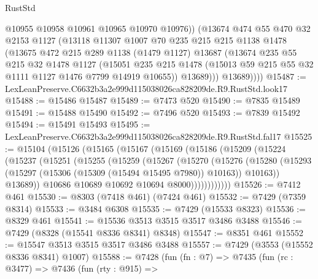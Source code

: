 \begin{lexlean}{RustStd}
\begin{coremodule}
              @10955
              @10958
              @10961
              @10965
              @10970
              @10976))
          (@13674
            @474
            @55
            @470
            @32
            @2153
            @1127
            (@13118
              @11307
              @1007
              @70
              @235
              @215
              @215
              @1138
              @1478
              (@13675
                @472
                @215
                @289
                @1138
                (@1479 @1127)
                @13687
                (@13674
                  @235
                  @55
                  @215
                  @32
                  @1478
                  @1127
                  (@15051
                    @235
                    @215
                    @1478
                    (@15013 @59 @215 @55 @32 @1111 @1127 @1476 @7799 @14919 @10655))
                  @13689)))
            @13689))))
@15487 := LexLeanPreserve.C6632b3a2e999d115038026ca828209de.R9.RustStd.look17
@15488 := @15486 @15487
@15489 := @7473 @520
@15490 := @7835 @15489
@15491 := @15488 @15490
@15492 := @7496 @520
@15493 := @7839 @15492
@15494 := @15491 @15493
@15495 := LexLeanPreserve.C6632b3a2e999d115038026ca828209de.R9.RustStd.fal17
@15525 := @15104
    (@15126
      (@15165
        (@15167
          (@15169
            (@15186
              (@15209
                (@15224
                  (@15237
                    (@15251
                      (@15255
                        (@15259
                          (@15267
                            (@15270
                              (@15276
                                (@15280
                                  (@15293
                                    (@15297 (@15306 (@15309 (@15494 @15495 @7980)) @10163))
                                    @10163))
                                @13689))
                            @10686
                            @10689
                            @10692
                            @10694
                            @8000))))))))))))
@15526 := @7412 @461
@15530 := @8303 (@7418 @461) (@7424 @461)
@15532 := @7429 (@7359 @8314)
@15533 := @3484 @6308
@15535 := @7429 (@15533 @8323)
@15536 := @8329 @461
@15541 := @15536 @3513 @3515 @3517 @3486 @3488
@15546 := @7429 (@8328 (@15541 @8336 @8341) @8348)
@15547 := @8351 @461
@15552 := @15547 @3513 @3515 @3517 @3486 @3488
@15557 := @7429 (@3553 (@15552 @8336 @8341) @1007)
@15588 := @7428
    (fun (fn : @7) =>
    @7435
      (fun (rc : @3477) =>
      @7436
        (fun (rty : @915) =>

\end{coremodule}
\end{lexlean}
